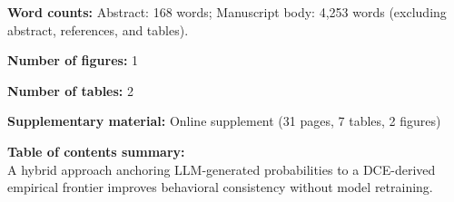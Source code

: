 \documentclass[11pt]{article}
\begin{document}
\noindent\textbf{Word counts:} Abstract: 168 words; Manuscript body: 4,253 words (excluding abstract, references, and tables).

\vspace{0.5em}

\noindent\textbf{Number of figures:} 1

\vspace{0.5em}

\noindent\textbf{Number of tables:} 2

\vspace{0.5em}

\noindent\textbf{Supplementary material:} Online supplement (31 pages, 7 tables, 2 figures)

\vspace{1.5em}

\noindent\textbf{Table of contents summary:}\\
A hybrid approach anchoring LLM-generated probabilities to a DCE-derived empirical frontier improves behavioral consistency without model retraining.
\end{document}
